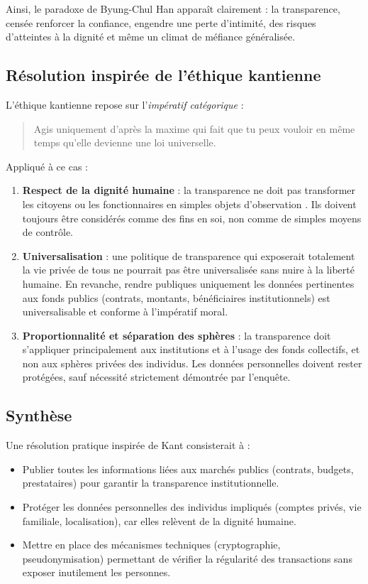 \documentclass[memoire, 12pt]{report}
\begin{document}
\begin{titlepage}
Ainsi, le paradoxe de Byung-Chul Han apparaît clairement : la transparence, censée renforcer la confiance, 
engendre une perte d’intimité, des risques d’atteintes à la dignité et même un climat de méfiance généralisée.

\subsection*{Résolution inspirée de l’éthique kantienne}

L’éthique kantienne repose sur l’\textit{impératif catégorique} :  
\begin{quote}
    \og Agis uniquement d’après la maxime qui fait que tu peux vouloir en même temps 
    qu’elle devienne une loi universelle. \fg
\end{quote}

Appliqué à ce cas :

\begin{enumerate}
    \item \textbf{Respect de la dignité humaine} : la transparence ne doit pas transformer les citoyens ou les fonctionnaires 
    en simples \og objets d’observation \fg. Ils doivent toujours être considérés comme des fins en soi, non comme de simples moyens de contrôle.  

    \item \textbf{Universalisation} : une politique de transparence qui exposerait totalement la vie privée de tous ne pourrait pas être universalisée 
    sans nuire à la liberté humaine. En revanche, rendre publiques uniquement les données pertinentes aux fonds publics (contrats, montants, bénéficiaires institutionnels) 
    est universalisable et conforme à l’impératif moral.  

    \item \textbf{Proportionnalité et séparation des sphères} : la transparence doit s’appliquer principalement aux institutions et à l’usage des fonds collectifs, 
    et non aux sphères privées des individus. Les données personnelles doivent rester protégées, sauf nécessité strictement démontrée par l’enquête.  
\end{enumerate}

\subsection*{Synthèse}

Une résolution pratique inspirée de Kant consisterait à :
\begin{itemize}
    \item Publier toutes les informations liées aux marchés publics (contrats, budgets, prestataires) pour garantir la transparence institutionnelle.
    \item Protéger les données personnelles des individus impliqués (comptes privés, vie familiale, localisation), car elles relèvent de la dignité humaine.
    \item Mettre en place des mécanismes techniques (cryptographie, pseudonymisation) permettant de vérifier la régularité des transactions sans exposer inutilement les personnes.
\end{itemize}


\end{titlepage}
\end{document}
